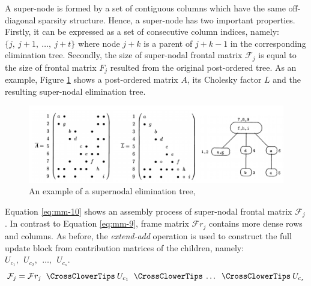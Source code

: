 A super-node is formed by a set of contiguous columns which have the same  off-diagonal sparsity structure. Hence, a super-node has two important properties. Firstly, it can be expressed as a set of consecutive column indices, namely: $\{j, \: j+1, \: \dots, \:j + t\}$ where node $j + k$ is a parent of $j + k - 1$ in the corresponding elimination tree. Secondly, the size of super-nodal frontal matrix $\mathcal{F}_{j}$ is equal to the size of frontal matrix $F_{j}$ resulted from the original post-ordered tree. As an example, Figure \ref{fig:supernodal-method-postordering-and-etree} shows a post-ordered matrix $A$, its Cholesky factor $L$ and the resulting super-nodal elimination tree.\\



\begin{figure}[!htpb]
  \centering
  \includegraphics[width=1.0\textwidth]{figures/chapter-2/supernodal-method-postordering-and-etree.png}
\caption[An example of a supernodal elimination tree]{An example of a supernodal elimination tree, \cite{mult-frontal-original:2}}
\label{fig:supernodal-method-postordering-and-etree}
\end{figure}
 
 
Equation \ref{eq:mm-10} shows an assembly process of super-nodal frontal matrix $\mathcal{F}_{j}$. In contrast to Equation  \ref{eq:mm-9}, frame matrix $\mathcal{F}r_{j}$ contains more dense rows and columns. As before, the \textit{extend-add} operation is used to construct the full update block from contribution matrices of the children, namely: $ U_{c_1}, \:\: U_{c_2}, \:\: \dots, \:\: U_{c_s} $.\\


\begin{equation} \label{eq:mm-10-0}
	\mathcal{F}_{j} = \mathcal{F}r_{j} \extendadd U_{c_1} \extendadd \dots \extendadd U_{c_s} 
\end{equation}



